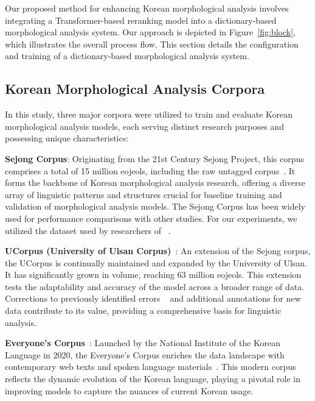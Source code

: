 \documentclass[AMS,STIX2COL]{WileyNJD-v2}
\begin{document}
    Our proposed method for enhancing Korean morphological analysis involves integrating a Transformer-based reranking model into a dictionary-based morphological analysis system.
    Our approach is depicted in Figure~\ref{fig:block}, which illustrates the overall process flow.
    This section details the configuration and training of a dictionary-based morphological analysis system.

    \subsection{Korean Morphological Analysis Corpora}\label{subsec:korean-morphological-analysis-corpora}

    In this study, three major corpora were utilized to train and evaluate Korean morphological analysis models, each serving distinct research purposes and possessing unique characteristics:

    \textbf{Sejong Corpus}: Originating from the 21st Century Sejong Project, this corpus comprises a total of 15 million eojeols, including the raw untagged corpus~\cite{ChoeMW2008}.
    It forms the backbone of Korean morphological analysis research, offering a diverse array of linguistic patterns and structures crucial for baseline training and validation of morphological analysis models.
    The Sejong Corpus has been widely used for performance comparisons with other studies.
    For our experiments, we utilized the dataset used by researchers of ~\cite{MinJW2019, MinJW2020, MinJW2022, MinJW2018, NaSH2015, NaSH2014, NaSH2018, SongHJ2019, SongHJ2020}.

    \textbf{UCorpus (University of Ulsan Corpus)}~\cite{UCorpusHG}: An extension of the Sejong corpus, the UCorpus is continually maintained and expanded by the University of Ulsan.
    It has significantly grown in volume, reaching 63 million eojeols.
    This extension tests the adaptability and accuracy of the model across a broader range of data.
    Corrections to previously identified errors ~\cite{KimIH2010} and additional annotations for new data contribute to its value, providing a comprehensive basis for linguistic analysis.

    \textbf{Everyone's Corpus}~\cite{EveryoneCorpus}: Launched by the National Institute of the Korean Language in 2020, the Everyone's Corpus enriches the data landscape with contemporary web texts and spoken language materials~\cite{KimIH2019}.
    This modern corpus reflects the dynamic evolution of the Korean language, playing a pivotal role in improving models to capture the nuances of current Korean usage.
\end{document}
